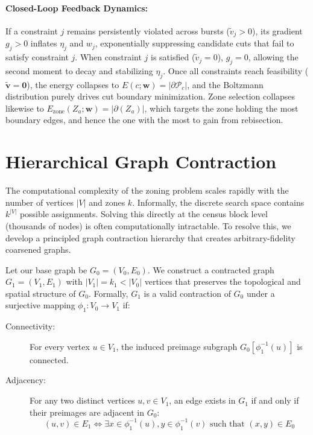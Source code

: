 \documentclass{article}
\begin{document}
\paragraph{Closed-Loop Feedback Dynamics:} If a constraint $j$ remains persistently violated across bursts ($\widetilde{v}_j > 0$), its gradient $g_j > 0$ inflates $\eta_j$ and $w_j$, exponentially suppressing candidate cuts that fail to satisfy constraint $j$. When constraint $j$ is satisfied ($\widetilde{v}_j = 0$), $g_j = 0$, allowing the second moment to decay and stabilizing $\eta_j$. Once all constraints reach feasibility ($\widetilde{\mathbf{v}} = \mathbf{0}$), the energy collapses to $E(c; \mathbf{w}) = |\partial \mathcal{P}_c|$, and the Boltzmann distribution purely drives cut boundary minimization. Zone selection collapses likewise to $E_{\mathrm{zone}}(Z_a; \mathbf{w}) = |\partial(Z_a)|$, which targets the zone holding the most boundary edges, and hence the one with the most to gain from rebisection.

\section{Hierarchical Graph Contraction}

The computational complexity of the zoning problem scales rapidly with the number of vertices $|V|$ and zones $k$. Informally, the discrete search space contains $k^{|V|}$ possible assignments. Solving this directly at the census block level (thousands of nodes) is often computationally intractable. To resolve this, we develop a principled graph contraction hierarchy that creates arbitrary-fidelity coarsened graphs.

Let our base graph be $G_0 = (V_0, E_0)$. We construct a contracted graph $G_1 = (V_1, E_1)$ with $|V_1| = k_1 < |V_0|$ vertices that preserves the topological and spatial structure of $G_0$. Formally, $G_1$ is a valid contraction of $G_0$ under a surjective mapping $\phi_1: V_0 \to V_1$ if:
\begin{description}
    \item[Connectivity:] For every vertex $u \in V_1$, the induced preimage subgraph $G_0[\phi_1^{-1}(u)]$ is connected.
    \item[Adjacency:] For any two distinct vertices $u, v \in V_1$, an edge exists in $G_1$ if and only if their preimages are adjacent in $G_0$:
    \[
    (u, v) \in E_1 \iff \exists x \in \phi_1^{-1}(u), y \in \phi_1^{-1}(v) \text{ such that } (x, y) \in E_0
    \]
\end{description}
\end{document}

